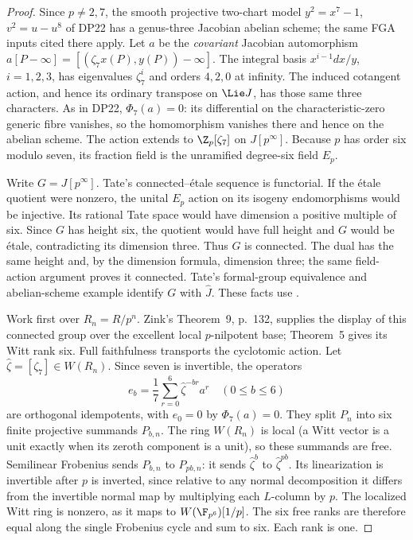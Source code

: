 \begin{proof}
Since $p\ne2,7$, the smooth projective two-chart model
$y^2=x^7-1$, $v^2=u-u^8$ of DP22 has a genus-three Jacobian abelian scheme; the same FGA inputs cited there apply.
Let $a$ be the \emph{covariant} Jacobian automorphism
$a[P-\infty]=[(\zeta_7x(P),y(P))-\infty]$.
The integral basis $x^{i-1}dx/y$, $i=1,2,3$, has eigenvalues
$\zeta_7^i$ and orders $4,2,0$ at infinity. The induced cotangent action, and hence its ordinary transpose on $\Lie J$, has those same three characters. As in DP22, $\Phi_7(a)=0$: its differential on the characteristic-zero generic fibre vanishes, so the homomorphism vanishes there and hence on the abelian scheme.
The action extends to $\Z_p[\zeta_7]$ on $J[p^\infty]$.
Because $p$ has order six modulo seven, its fraction field is the unramified degree-six field $E_p$.

Write $G=J[p^\infty]$. Tate's connected--\'etale sequence is functorial.
If the \'etale quotient were nonzero, the unital $E_p$ action on its isogeny endomorphisms would be injective. Its rational Tate space would have dimension a positive multiple of six. Since $G$ has height six, the quotient would have full height and $G$ would be \'etale, contradicting its dimension three.
Thus $G$ is connected. The dual has the same height and, by the dimension formula, dimension three; the same field-action argument proves it connected. Tate's formal-group equivalence and abelian-scheme example identify $G$ with $\widehat J$.
These facts use \cite[\S1.4, p.~160; \S2.1 Example (a), p.~161; \S2.2 Proposition 1 and (4), pp.~162,164; \S2.3 Proposition 3 and Example (b), p.~166]{Tate67}.

Work first over $R_n=R/p^n$. Zink's Theorem~9, p.~132, supplies the display of this connected group over the excellent local $p$-nilpotent base; Theorem~5 gives its Witt rank six. Full faithfulness transports the cyclotomic action.
Let $\widehat\zeta=[\zeta_7]\in W(R_n)$. Since seven is invertible, the operators
\[
 e_b=\frac17\sum_{r=0}^6\widehat\zeta^{-br}a^r
       \quad(0\le b\le6)
\]
are orthogonal idempotents, with $e_0=0$ by $\Phi_7(a)=0$.
They split $P_n$ into six finite projective summands $P_{b,n}$.
The ring $W(R_n)$ is local (a Witt vector is a unit exactly when its zeroth component is a unit), so these summands are free.
Semilinear Frobenius sends $P_{b,n}$ to $P_{pb,n}$: it sends
$\widehat\zeta^b$ to $\widehat\zeta^{pb}$.
Its linearization is invertible after $p$ is inverted, since relative to any normal decomposition it differs from the invertible normal map by multiplying each $L$-column by $p$.
The localized Witt ring is nonzero, as it maps to
$W(\F_{p^6})[1/p]$.
The six free ranks are therefore equal along the single Frobenius cycle and sum to six. Each rank is one.


\end{proof}
